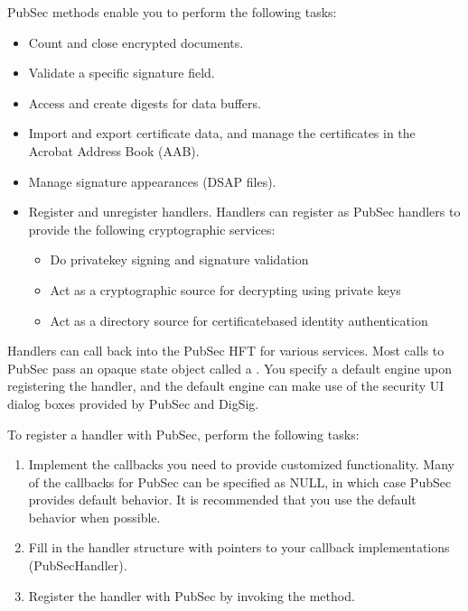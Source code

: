 \documentclass[letterpaper,12pt,english,openany,oneside]{sphinxmanual}
\begin{document}
PubSec methods enable you to perform the following tasks:
\begin{itemize}
\item {} 
Count and close encrypted documents.

\item {} 
Validate a specific signature field.

\item {} 
Access and create digests for data buffers.

\item {} 
Import and export certificate data, and manage the certificates in the Acrobat Address Book (AAB).

\item {} 
Manage signature appearances (DSAP files).

\item {} 
Register and unregister handlers. Handlers can register as PubSec handlers to provide the following cryptographic services:
\begin{itemize}
\item {} 
Do private\sphinxhyphen{}key signing and signature validation

\item {} 
Act as a cryptographic source for decrypting using private keys

\item {} 
Act as a directory source for certificate\sphinxhyphen{}based identity authentication

\end{itemize}

\end{itemize}

Handlers can call back into the PubSec HFT for various services. Most calls to PubSec pass an opaque state object called a . You specify a default engine upon registering the handler, and the default engine can make use of the security UI dialog boxes provided by PubSec and DigSig.

To register a handler with PubSec, perform the following tasks:
\begin{enumerate}
%
\item {} 
Implement the callbacks you need to provide customized functionality. Many of the callbacks for PubSec can be specified as NULL, in which case PubSec provides default behavior. It is recommended that you use the default behavior when possible.

\item {} 
Fill in the handler structure with pointers to your callback implementations (PubSecHandler).

\item {} 
Register the handler with PubSec by invoking the  method.

\end{enumerate}
\end{document}
